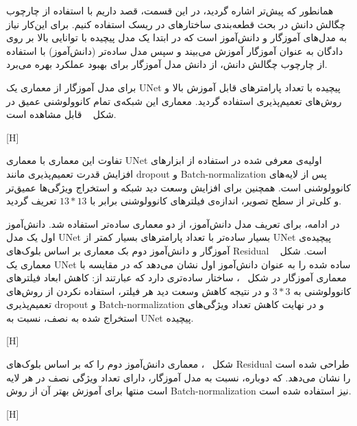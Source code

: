 همانطور که پیش‌تر اشاره گردید، در این قسمت، قصد داریم با استفاده از چارچوب چگالش دانش در بحث قطعه‌بندی ساختارهای در ریسک استفاده کنیم. برای این‌کار نیاز به مدل‌های آموزگار و دانش‌آموز است که در ابتدا یک مدل پیچیده با توانایی بالا بر روی دادگان به عنوان آموزگار آموزش می‌بیند و سپس مدل ساده‌تر (دانش‌آموز) با استفاده از چارچوب چگالش دانش، از دانش مدل آموزگار برای بهبود عملکرد بهره می‌برد.

برای مدل آموزگار از معماری یک UNet پیچیده با تعداد پارامتر‌های قابل آموزش بالا و روش‌های تعمیم‌پذیری استفاده گردید. معماری این شبکه‌ی تمام کانوولوشنی عمیق در شکل ~ قابل مشاهده است.

[H]

تفاوت این معماری با معماری UNet اولیه‌ی معرفی شده در  استفاده از ابزارهای افزایش قدرت تعمیم‌پذیری مانند dropout و Batch-normalization پس از لایه‌های کانوولوشنی است. همچنین برای افزایش وسعت دید شبکه و استخراج ویژگی‌ها عمیق‌تر  و کلی‌تر از سطح تصویر، اندازه‌ی فیلتر‌های کانوولوشنی برابر با $13*13$ تعریف گردید.

در ادامه، برای تعریف مدل دانش‌آموز، از دو معماری ساده‌تر استفاده شد. دانش‌آموز اول یک مدل UNet بسیار ساده‌تر با تعداد پارامترهای بسیار کمتر از UNet پیچیده‌ی آموزگار و دانش‌آموز دوم بک معماری بر اساس بلوک‌های Residual است. شکل ~ معماری یک UNet ساده شده را به عنوان دانش‌آموز اول نشان می‌دهد که در مقایسه با معماری آموزگار در شکل ~، ساختار ساده‌تری دارد که عبارتند از: کاهش ابعاد فیلترهای کانوولوشنی به $3*3$ و در نتیجه کاهش وسعت دید هر فیلتر، استفاده نکردن از روش‌های تعمیم‌پذیری dropout و Batch-normalization و در نهایت کاهش تعداد ویژگی‌های استخراج شده به نصف، نسبت به UNet پیچیده. 

[H]

شکل ~، معماری دانش‌آموز دوم را که بر اساس بلوک‌های Residual طراحی شده است را نشان می‌دهد. که دوباره، نسبت به مدل آموزگار، دارای تعداد ویژگی نصف در هر لایه‌ است منتها برای آموزش بهتر آن از روش Batch-normalization نیز استفاده شده است.

[H]


